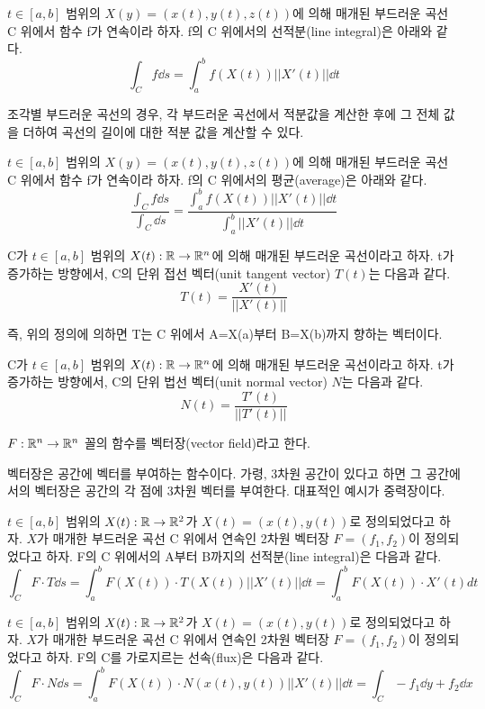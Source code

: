 \begin{definition}
$t\in[a,b]$ 범위의 $X(y)=(x(t),y(t),z(t))$에 의해 매개된 부드러운 곡선 C 위에서 함수 f가 연속이라 하자. f의 C 위에서의 선적분(line integral)은 아래와 같다.
$$
\int_C f\dd s = \int_a^b f(X(t))||X'(t)||\dd t
$$
\end{definition}
조각별 부드러운 곡선의 경우, 각 부드러운 곡선에서 적분값을 계산한 후에 그 전체 값을 더하여 곡선의 길이에 대한 적분 값을 계산할 수 있다.
\begin{definition}[선적분의 평균]
$t\in[a,b]$ 범위의 $X(y)=(x(t),y(t),z(t))$에 의해 매개된 부드러운 곡선 C 위에서 함수 f가 연속이라 하자. f의 C 위에서의 평균(average)은 아래와 같다.
$$
\frac{\int_C f\dd s}{\int_C \dd s} = \frac{\int_a^b f(X(t))||X'(t)||\dd t}{\int_a^b ||X'(t)||\dd t}
$$
\end{definition}
\begin{definition}[곡선에서의 단위 접선 벡터]
C가 $t\in[a,b]$ 범위의 $X(t):\mathbb{R}\to\mathbb{R}^n$에 의해 매개된 부드러운 곡선이라고 하자. t가 증가하는 방향에서, C의 단위 접선 벡터(unit tangent vector) $T(t)$는 다음과 같다.
$$
T(t)=\frac{X'(t)}{||X'(t)||}
$$
\end{definition}
즉, 위의 정의에 의하면 T는 C 위에서 A=X(a)부터 B=X(b)까지 향하는 벡터이다.
\begin{definition}[곡선에서의 단위 법선 벡터]
C가 $t\in[a,b]$ 범위의 $X(t):\mathbb{R}\to\mathbb{R}^n$에 의해 매개된 부드러운 곡선이라고 하자. t가 증가하는 방향에서, C의 단위 법선 벡터(unit normal vector) $N$는 다음과 같다.
$$
N(t)=\frac{T'(t)}{||T'(t)||}
$$
\end{definition}
\begin{definition}[벡터장]
$F:\mathbb{R}^n\to\mathbb{R}^n$ 꼴의 함수를 벡터장(vector field)라고 한다.
\end{definition}
벡터장은 공간에 벡터를 부여하는 함수이다. 가령, 3차원 공간이 있다고 하면 그 공간에서의 벡터장은 공간의 각 점에 3차원 벡터를 부여한다. 대표적인 예시가 중력장이다.
\begin{definition}
$t\in[a,b]$ 범위의 $X(t):\mathbb{R}\to\mathbb{R}^2$가 $X(t)=(x(t),y(t))$로 정의되었다고 하자. $X$가 매개한 부드러운 곡선 C 위에서 연속인 2차원 벡터장 $F=(f_1,f_2)$이 정의되었다고 하자. F의 C 위에서의 A부터 B까지의 선적분(line integral)은 다음과 같다.
$$
\int_CF\cdot T \dd s = \int_a^b F(X(t))\cdot T(X(t))||X'(t)||\dd t = \int_a^b F(X(t))\cdot X'(t)dt
$$
\end{definition}
\begin{definition}[2차원 벡터장의 선속]
$t\in[a,b]$ 범위의 $X(t):\mathbb{R}\to\mathbb{R}^2$가 $X(t)=(x(t),y(t))$로 정의되었다고 하자. $X$가 매개한 부드러운 곡선 C 위에서 연속인 2차원 벡터장 $F=(f_1,f_2)$이 정의되었다고 하자. F의 C를 가로지르는 선속(flux)은 다음과 같다.
$$
\int_CF\cdot N\dd s = \int_a^b F(X(t))\cdot N(x(t),y(t))||X'(t)||\dd t=\int_C -f_1\dd y+f_2\dd x
$$
\end{definition}

